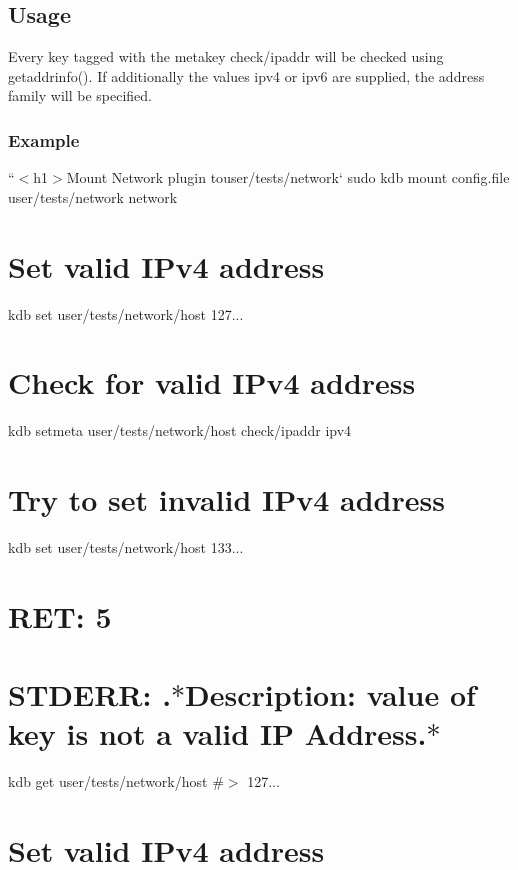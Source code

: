 \subsection*{Usage}

Every key tagged with the metakey {\ttfamily check/ipaddr} will be checked using {\ttfamily getaddrinfo()}. If additionally the values {\ttfamily ipv4} or {\ttfamily ipv6} are supplied, the address family will be specified.

\subsubsection*{Example}

``{\ttfamily  $<$h1$>$Mount Network plugin to}user/tests/network` sudo kdb mount config.\+file user/tests/network network

\section*{Set valid I\+Pv4 address}

kdb set user/tests/network/host 127... \section*{Check for valid I\+Pv4 address}

kdb setmeta user/tests/network/host check/ipaddr ipv4

\section*{Try to set invalid I\+Pv4 address}

kdb set user/tests/network/host 133... \section*{R\+ET\+: 5}

\section*{S\+T\+D\+E\+RR\+: .$\ast$\+Description\+: value of key is not a valid IP Address.$\ast$}

kdb get user/tests/network/host \#$>$ 127...

\section*{Set valid I\+Pv4 address}

